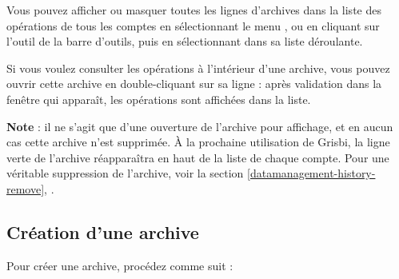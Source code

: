 Vous pouvez afficher ou masquer toutes les lignes d'archives dans la liste des opérations de tous les comptes en sélectionnant le menu , ou en cliquant sur l'outil  de la barre d'outils, puis en sélectionnant  dans sa liste déroulante.

Si vous voulez consulter les opérations à l'intérieur d'une archive, vous pouvez ouvrir cette archive en double-cliquant sur sa ligne : après validation dans la fenêtre qui apparaît, les opérations sont affichées dans la liste. 

\textbf{Note} : il ne s'agit que d'une ouverture de l'archive pour affichage, et en aucun cas cette archive n'est supprimée. À la prochaine utilisation de Grisbi, la ligne verte de l'archive réapparaîtra en haut de la liste de chaque compte. Pour une véritable suppression de l'archive, voir la section \vref{datamanagement-history-remove}, .


\subsection{Création d'une archive\label{datamanagement-history-new}}

Pour créer une archive, procédez comme suit :

